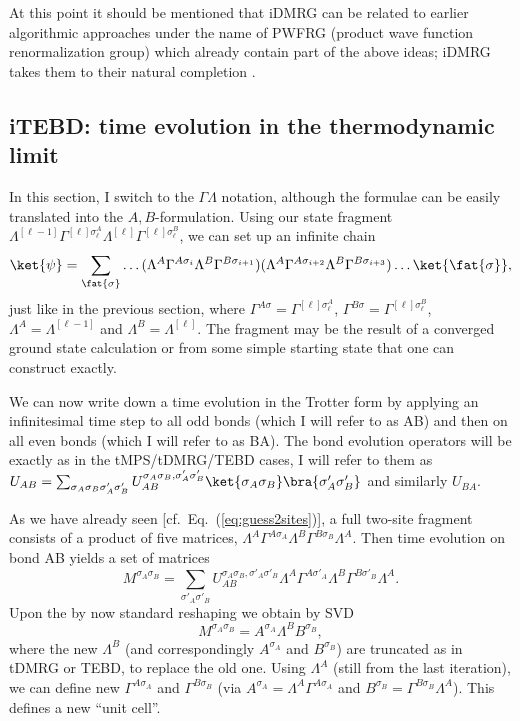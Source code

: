 At this point it should be mentioned that iDMRG can be related to earlier algorithmic approaches under the name of PWFRG (product wave function renormalization group) \cite{NishinoOkunishi95,Hieida97,Ueda06} which already contain part of the above ideas; iDMRG takes them to their natural completion \cite{Ueda08,Ueda10}.

\subsection{iTEBD: time evolution in the thermodynamic limit}
In this section, I switch to the $\Gamma\Lambda$ notation, although the formulae can be easily translated into the $A,B$-formulation. Using our state fragment $\Lambda^{[\ell-1]} \Gamma^{[\ell]\sigma_\ell^A} \Lambda^{[\ell]} \Gamma^{[\ell]\sigma_\ell^B}$, we can set up an infinite chain
\begin{equation}
\ket{\psi} = \sum_{\fat{\sigma}} \ldots (\Lambda^A \Gamma^{A \sigma_i} \Lambda^B \Gamma^{B \sigma_{i+1}})(\Lambda^A \Gamma^{A \sigma_{i+2}} \Lambda^B \Gamma^{B \sigma_{i+3}}) \ldots \ket{\fat{\sigma}} ,
\end{equation}
just like in the previous section, where $\Gamma^{A\sigma}= \Gamma^{[\ell]\sigma_\ell^A}$,
$\Gamma^{B\sigma}= \Gamma^{[\ell]\sigma_\ell^B}$, $\Lambda^A=\Lambda^{[\ell-1]}$ and 
$\Lambda^B=\Lambda^{[\ell]}$. The fragment may be the result of a converged ground state calculation or from some simple starting state that one can construct exactly. 

We can now write down a time evolution in the Trotter form by applying an infinitesimal time step to all odd bonds (which I will refer to as AB) and then on all even bonds (which I will refer to as BA). The bond evolution operators will be exactly as in the tMPS/tDMRG/TEBD cases, I will refer to them as $U_{AB} = \sum_{\sigma_A\sigma_B\sigma'_A\sigma'_B} U_{AB}^ {\sigma_A\sigma_B, \sigma'_A\sigma'_B} \ket{\sigma_A\sigma_B} \bra{\sigma'_A\sigma'_B}$ and similarly $U_{BA}$.

As we have already seen [cf.\ Eq.~(\ref{eq:guess2sites})], a full two-site fragment consists of a product of five matrices, 
$\Lambda^A \Gamma^{A \sigma_A} \Lambda^B \Gamma^{B \sigma_{B}} \Lambda^A$. Then time evolution on bond AB yields a set of matrices
\begin{equation}
M^{\sigma_A\sigma_{B}} = \sum_{\sigma'_A\sigma'_{B}} U_{AB}^ {\sigma_A\sigma_{B}, \sigma'_A\sigma'_{B}}  \Lambda^A \Gamma^{A \sigma'_A} \Lambda^B \Gamma^{B \sigma'_{B}} \Lambda^A .
\end{equation}
Upon the by now standard reshaping we obtain by SVD 
\begin{equation}
M^{\sigma_A\sigma_{B}}=A^{\sigma_A} \Lambda^B B^{\sigma_{B}} ,
\end{equation}
where the new $\Lambda^B$ (and correspondingly $A^{\sigma_A}$ and $B^{\sigma_{B}}$) are truncated as in tDMRG or TEBD, to replace the old one. Using $\Lambda^A$ (still from the last iteration), we can define new $\Gamma^{A \sigma_A}$ and $\Gamma^{B \sigma_{B}} $ (via $A^{\sigma_A} = \Lambda^A \Gamma^{A \sigma_A}$ and
$B^{\sigma_{B}} = \Gamma^{B \sigma_{B}} \Lambda^A$). This defines a new ``unit cell''. 

